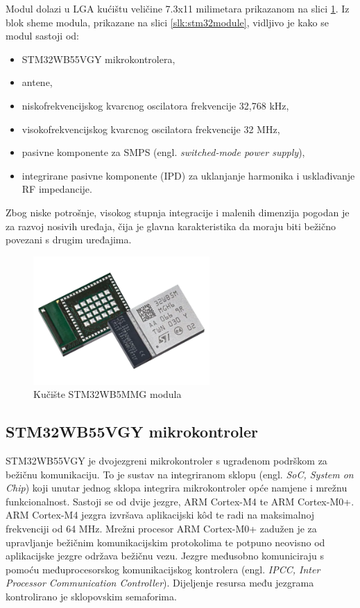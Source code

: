 \documentclass[../diplomski_rad.tex]{subfiles}
\begin{document}
Modul dolazi u LGA kućištu veličine 7.3x11 milimetara prikazanom na slici \ref{slk:stm32module_kuciste}. 
Iz blok sheme modula, prikazane na slici \ref{slk:stm32module}, 
vidljivo je kako se modul sastoji od:
\begin{itemize}
    \item STM32WB55VGY mikrokontrolera,
    \item antene,
    \item niskofrekvencijskog kvarcnog oscilatora frekvencije 32,768 kHz,
    \item visokofrekvencijskog kvarcnog oscilatora frekvencije 32 MHz,
    \item pasivne komponente za SMPS (engl. \textit{switched-mode power supply}), 
    \item integrirane pasivne komponente (IPD) za uklanjanje harmonika i usklađivanje RF impedancije.     
  \end{itemize} 
Zbog niske potrošnje, visokog stupnja integracije i malenih dimenzija pogodan je za razvoj nosivih uređaja, 
čija je glavna karakteristika da moraju biti bežično povezani s drugim uređajima. 

\begin{figure}[htb]
    \centering
    \includegraphics[width=0.6\textwidth]{Figures/modul.png} 
    \caption{Kučište STM32WB5MMG modula \cite{modul_slika}}
    \label{slk:stm32module_kuciste}
\end{figure}

\subsection{STM32WB55VGY mikrokontroler}

STM32WB55VGY je dvojezgreni mikrokontroler s ugrađenom podrškom za bežičnu komunikaciju. 
To je sustav na integriranom sklopu (engl. \textit{SoC, System on Chip}) koji unutar jednog sklopa integrira mikrokontroler opće namjene i mrežnu funkcionalnost. 
Sastoji se od dvije jezgre, ARM Cortex-M4 te ARM Cortex-M0+.  
ARM Cortex-M4 jezgra izvršava aplikacijski k\^{o}d te radi na maksimalnoj frekvenciji od 64 MHz. 
Mrežni procesor ARM Cortex-M0+ zadužen je za upravljanje bežičnim komunikacijskim protokolima 
te potpuno neovisno od aplikacijske jezgre održava bežičnu vezu.
Jezgre međusobno komuniciraju s pomoću međuprocesorskog komunikacijskog kontrolera (engl. \textit{IPCC,  Inter Processor
Communication Controller}). 
Dijeljenje resursa među jezgrama kontrolirano je sklopovskim semaforima.
\end{document}

